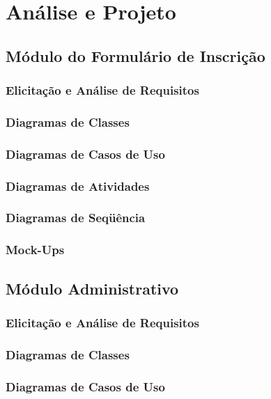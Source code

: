 \documentclass[
  10.5pt,				  %
	openright,			%
	twoside,			  %
  a5paper,
  chapter=TITLE,	%
	section=TITLE,	%
  hyphens,        %
	english,        %
	brazil          %
]{abntex2}
\begin{document}
\chapter{Análise e Projeto}

\section{Módulo do Formulário de Inscrição}

\subsection{Elicitação e Análise de Requisitos}
\subsection{Diagramas de Classes}
\subsection{Diagramas de Casos de Uso}
\subsection{Diagramas de Atividades}
\subsection{Diagramas de Seqüência}
\subsection{Mock-Ups}

\section{Módulo Administrativo}

\subsection{Elicitação e Análise de Requisitos}
\subsection{Diagramas de Classes}
\subsection{Diagramas de Casos de Uso}
\end{document}
